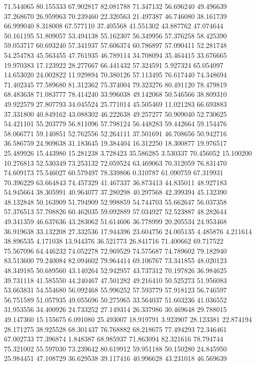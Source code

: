 71.544065
80.155333
67.902817
82.081788
71.347132
56.696240
49.496639
37.268670
26.959963
70.239460
22.320563
21.497387
46.746080
38.161739
66.999040
8.318008
67.577110
37.405568
41.551302
43.887762
47.074644
50.161195
51.809057
53.494138
55.162307
56.349956
57.376258
58.425390
59.053717
60.693240
57.341937
57.606374
60.786897
57.090411
52.281748
54.254783
45.563455
47.761935
46.789114
34.708094
35.464415
33.676665
19.970383
17.123922
28.277667
66.441432
57.324591
5.927324
65.054097
14.653020
24.002822
11.929894
70.380126
57.113495
76.617440
74.348694
71.402345
77.589680
81.312362
75.374004
79.323276
80.491120
78.479819
68.483638
71.083777
78.414240
33.996038
49.142068
50.546566
38.809310
49.922579
27.807793
34.045524
25.771014
45.505469
11.021283
66.693883
37.331800
40.849162
43.088302
46.222638
49.257277
50.909040
52.730625
54.421101
55.203779
56.811096
57.798124
56.448283
59.442664
59.154476
58.066771
59.140851
52.762556
52.264111
37.501691
46.708656
50.942716
36.586759
24.909638
31.183645
19.384404
16.312250
18.300877
19.976517
25.489926
15.443980
15.281238
3.728423
35.586285
3.530337
70.456052
15.100200
10.276813
52.530349
73.253132
72.059524
63.469063
70.312059
76.831470
74.609173
75.546027
60.579497
78.339806
0.310787
61.090759
67.319931
70.396229
63.664843
74.457329
41.467337
36.873413
44.835011
48.927183
54.945664
38.305991
40.964077
37.280298
40.297568
42.399394
45.132390
48.132848
50.163909
51.794909
52.998859
54.744703
55.662647
56.037358
57.376513
57.708826
60.462035
59.092889
57.034927
52.523887
48.282644
49.341359
46.637636
43.283062
51.614606
36.778999
20.205534
24.953468
36.919638
33.132208
27.332536
17.944396
23.604756
24.005135
4.485876
4.211614
38.896535
4.171038
13.944376
36.521773
26.841716
71.400662
69.717522
75.567096
64.446232
74.052278
72.969529
74.575687
74.789602
79.182940
83.513600
79.240084
82.094602
79.964414
69.106767
73.341855
48.020123
48.349185
50.689560
43.140264
52.942957
43.737312
70.197826
36.984625
39.731118
41.585550
44.240467
47.501282
49.216410
50.525273
51.956083
53.663831
54.554680
56.092468
55.996252
57.593779
57.918123
56.746597
56.751589
51.057935
49.055696
50.275965
33.564037
51.603236
41.036552
31.953556
34.400926
24.733252
27.149314
26.337986
30.469648
29.788015
49.147360
15.155675
6.091080
25.493007
18.919791
3.923907
28.123381
22.874194
28.171275
38.925528
68.301437
76.768882
68.218675
77.494293
72.346461
67.002733
77.396874
1.848387
68.985937
71.863094
82.321616
78.794744
75.321002
55.597030
73.239642
80.619912
59.951188
50.150280
24.845950
25.984451
47.108729
36.629538
39.117416
40.996628
43.231018
46.569639
